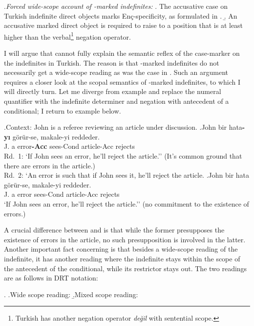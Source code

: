 \documentclass[11pt,a4paper]{article}
\newcommand{\encspec}{Enç-specific}
\begin{document}
\ex.\label{wscopeaccount}{\it Forced wide-scope account of \acc-marked indefinites:}
\a. The accusative case on Turkish indefinite direct objects marks \encspec ity, as formulated in . 
\b. An accusative marked direct object is required to raise to a position that is at least higher than the verbal\footnote{Turkish has another negation operator \textit{değil} with sentential scope.} negation operator.


I will argue that  cannot fully explain the semantic reflex
of the case-marker on the indefinites in Turkish. The reason is that
\acc-marked indefinites do not necessarily get a wide-scope reading as was the
case in . Such an argument requires a closer look at the
scopal semantics of \acc-marked indefinites, to which I will directly turn. Let
me diverge from  example and  replace the numeral quantifier
 with the indefinite determiner  and
negation with antecedent of a conditional; I return to  example
below.

\ex.Context: John is a referee reviewing an article under discussion.
\ag.\label{conda}John bir hata{\bf-yı} görür-se, makale-yi reddeder.\\
	J. a error{\bf-Acc} sees-Cond article-Acc rejects\\
	Rd.\ 1: `If John sees an error, he'll reject the article.'' (It's common
	ground that there are errors in the article.)\\
	Rd.\ 2: `An error is such that if John sees it, he'll reject the article.
\bg.\label{condz}John bir hata görür-se, makale-yi reddeder.\\
	J. a error sees-Cond article-Acc rejects\\
	`If John sees an error, he'll reject the article.'' (no commitment to the existence of errors.)


A crucial difference between  and  is that while the
former presupposes the existence of errors in the article, no such
presupposition is involved in the latter. Another important fact concerning
 is that besides a wide-scope reading of the indefinite, it has
another reading where the indefinite stays within the scope of the antecedent
of the conditional, while its restrictor stays out. The two readings are as
follows in DRT notation:

\ex. 
\a.\label{condawide}Wide scope reading:
\b.\label{condanar}Mixed scope reading:
\end{document}
